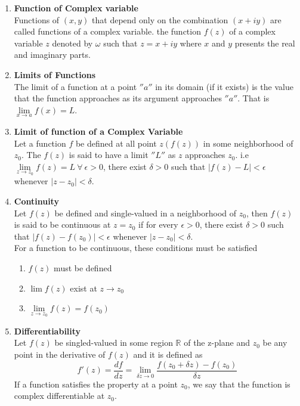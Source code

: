 \documentclass[12pt]{report}
\newcommand{\bt}[1]{\textbf{#1}}
\newcommand{\real}{ \mathbb{R}}
\begin{document}
	\begin{enumerate}
		\item\bt{Function of Complex variable}\\
		Functions of $(x,y)$ that depend only on the combination $(x+iy)$ are called functions of a complex variable. the function $f(z)$ of a complex variable $z$ denoted by $\omega$ such that $z=x+iy$ where $x$ and $y$ presents the real and imaginary parts.
		
		\item\bt{Limits of Functions}\\
		The limit of a function at a point $''a''$ in its domain (if it exists) is the value that the function approaches as its argument approaches $''a''$. That is $\lim\limits_{x\rightarrow a}f(x) = L$.
		
		\item\bt{Limit of function of a Complex Variable}\\
		Let a function $f$ be defined at all point $z(f(z))$ in some neighborhood of $z_0$. The $f(z)$ is said to have a limit $''L''$ as $z$ approaches $z_0$. i.e $\lim\limits_{z\rightarrow z_0}f(z) =L ~\forall~ \epsilon > 0$, there exist $\delta>0$ such that $|f(z)-L|<\epsilon$ whenever $|z-z_0|<\delta$.
		
		
		\item\bt{Continuity}\\
		Let $f(z)$ be defined and single-valued in a neighborhood of $z_0$, then $f(z)$ is said to be continuous at $z=z_0$ if for every $\epsilon >0$, there exist $\delta > 0$ such that $|f(z)-f(z_0)|<\epsilon$ whenever $|z-z_0|< \delta$.\\
		For a function to be continuous, these conditions must be satisfied
		\begin{enumerate}
			\item $f(z)$ must be defined
			\item $\lim f(z)$ exist at $z\rightarrow z_0$
			\item $\lim\limits_{z\rightarrow z_0}f(z) = f(z_0)$
		\end{enumerate}
		\item\bt{Differentiability}\\
		Let $f(z)$ be singled-valued in some region $\real$ of the z-plane and $z_0$ be any point in the derivative of $f(z)$ and it is defined as
		\begin{equation}
			f'(z) = \frac{df}{dz} = \lim\limits_{\delta z\rightarrow 0 }\frac{f(z_0 + \delta z) - f(z_0)}{\delta z}
		\end{equation}	
		If a function satisfies the property at a point $z_0$, we say that the function is complex differentiable at $z_0$.
		

\end{enumerate}
\end{document}
